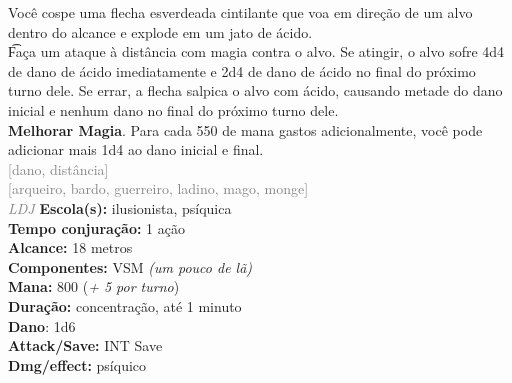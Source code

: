 \documentclass{RPG_Adventure}[2021/10/20]
\begin{document}
{\normalsize Você cospe uma flecha esverdeada cintilante que voa em direção de um alvo dentro do alcance e explode em um jato de ácido.\\\t Faça um ataque à distância com magia contra o alvo. Se atingir, o alvo sofre 4d4 de dano de ácido imediatamente e 2d4 de dano de ácido no final do próximo turno dele. Se errar, a flecha salpica o alvo com ácido, causando metade do dano inicial e nenhum dano no final do próximo turno dele.\\\t \textbf{Melhorar Magia}. Para cada 550 de mana gastos adicionalmente, você pode adicionar mais 1d4 ao dano inicial e final.\\}
{\scriptsize \textcolor{gray}{[dano, distância]\\}}
{\scriptsize \textcolor{gray}{[arqueiro, bardo, guerreiro, ladino, mago, monge]\\}}
{\tiny \textcolor{gray}{\textit{LDJ}}}
{\small \t \textbf{Escola(s):} ilusionista, psíquica\\\t \textbf{Tempo conjuração:} 1 ação\\\t \textbf{Alcance:} 18 metros\\\t \textbf{Componentes:} VSM \textit{(um pouco de lã)}\\\t \textbf{Mana:} 800 (\textit{+ 5 por turno})\\\t \textbf{Duração:} concentração, até 1 minuto\\\t \textbf{Dano}: 1d6\\\t \textbf{Attack/Save:} INT Save\\\t \textbf{Dmg/effect:} psíquico\\}
\end{document}
